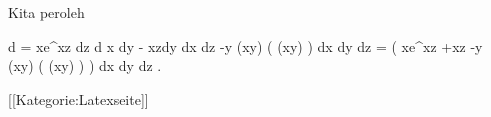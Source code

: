 Kita peroleh

\mavergleichskettealign
{\vergleichskettealign
{ d \omega
}
{ =} { xe^{xz} dz \wedge d x \wedge dy - xzdy \wedge dx \wedge dz  -y \sin (xy)  \cos ( \cos (xy) )  dx \wedge dy \wedge dz
}
{ =} {  \left(  xe^{xz} +xz  -y \sin (xy)  \cos ( \cos (xy) )  \right) dx \wedge dy \wedge dz
}
{ } {
}
{ } {}
}
{}
{}{.}

 [[Kategorie:Latexseite]]
